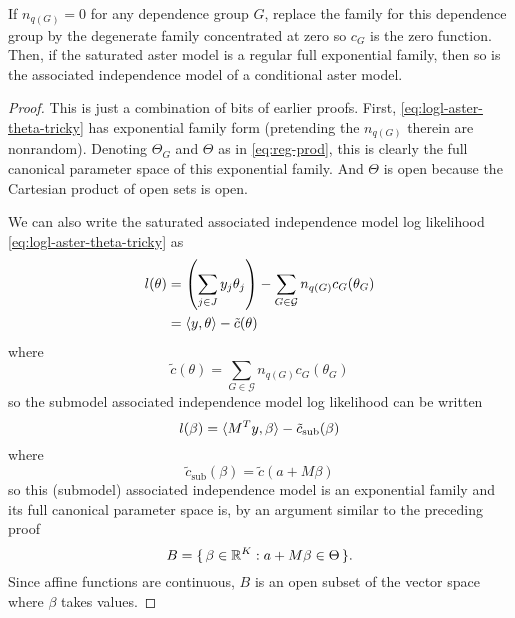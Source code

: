 \begin{theorem} \label{th:regular-tricky}
If $n_{q(G)} = 0$ for any dependence group $G$, replace
the family for this dependence group by the degenerate family concentrated
at zero so $c_G$ is the zero function.
Then, if the saturated aster model is a regular full exponential family,
then so is the associated independence model of a conditional aster model.
\end{theorem}
\begin{proof}
This is just a combination of bits of earlier proofs.  First,
\eqref{eq:logl-aster-theta-tricky} has exponential family form
(pretending the $n_{q(G)}$ therein are nonrandom).  Denoting $\Theta_G$
and $\Theta$ as in \eqref{eq:reg-prod}, this is clearly the full canonical
parameter space of this exponential family.  And $\Theta$ is open because
the Cartesian product of open sets is open.

We can also write the saturated associated independence model log likelihood
\eqref{eq:logl-aster-theta-tricky} as
\begin{align*}
   l(\theta)
   & =
   \left( \sum_{j \in J} y_j \theta_j \right)
   -
   \sum_{G \in \mathcal{G}} n_{q(G)} c_G(\theta_G)
   \\
   & =
   \langle y, \theta \rangle - \tilde{c}(\theta)
\end{align*}
where
$$
   \tilde{c}(\theta)
   =
   \sum_{G \in \mathcal{G}} n_{q(G)} c_G(\theta_G)
$$
so the submodel associated independence model log likelihood can be written
$$
   l(\beta) = \langle M^T y, \beta \rangle - \tilde{c}_\text{sub}(\beta)
$$
where
$$
   \tilde{c}_\text{sub}(\beta)
   =
   \tilde{c}(a + M \beta)
$$
so this (submodel) associated independence model is an exponential family
and its full canonical parameter space is, by an argument similar to the
preceding proof
$$
   B = \{\,  \beta \in \mathbb{R}^K : a + M \beta \in \Theta  \,\}.
$$
Since affine functions are continuous, $B$ is an open subset of the vector
space where $\beta$ takes values.
\end{proof}
